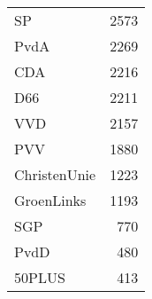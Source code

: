 \begin{tabular}{lr}
\toprule
SP           &  2573 \\
PvdA         &  2269 \\
CDA          &  2216 \\
D66          &  2211 \\
VVD          &  2157 \\
PVV          &  1880 \\
ChristenUnie &  1223 \\
GroenLinks   &  1193 \\
SGP          &   770 \\
PvdD         &   480 \\
50PLUS       &   413 \\
\bottomrule
\end{tabular}

